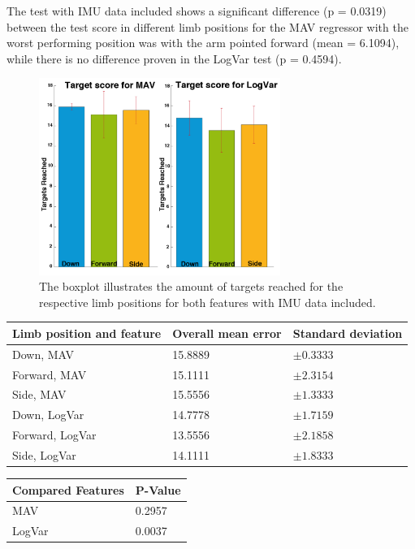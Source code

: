 The test with IMU data included shows a significant difference (p = 0.0319) between the test score in different limb positions for the MAV regressor with the worst performing position was with the arm pointed forward (mean = 6.1094), while there is no difference proven in the LogVar test (p = 0.4594).

\begin{figure}[H]
	\includegraphics[width=0.7\textwidth]{figures/results/TargetsReachedIMU}  %
	\caption{The boxplot illustrates the amount of targets reached for the respective limb positions for both features with IMU data included.}
	\label{fig:TargetsReachedIMU}  %
\end{figure}

	\begin{center}
		\begin{tabular}{l l l}
			\toprule
			\textbf{Limb position and feature} & \textbf{Overall mean error} & \textbf{Standard deviation}\\
			\midrule
			Down, MAV & 15.8889 & $\pm 0.3333$ \\
			Forward, MAV & 15.1111 & $\pm 2.3154$ \\
			Side, MAV & 15.5556 & $\pm 1.3333$ \\
			Down, LogVar & 14.7778 & $\pm 1.7159$ \\
			Forward, LogVar & 13.5556 & $\pm 2.1858$ \\
			Side, LogVar & 14.1111 & $\pm 1.8333$ \\
			\bottomrule
		\end{tabular}
	\end{center}
	
	\begin{center}
		\begin{tabular}{l l}
			\toprule
			\textbf{Compared Features} & \textbf{P-Value}\\
			\midrule
			MAV & 0.2957 \\
			LogVar & 0.0037 \\
			\bottomrule
		\end{tabular}
	\end{center}
	
